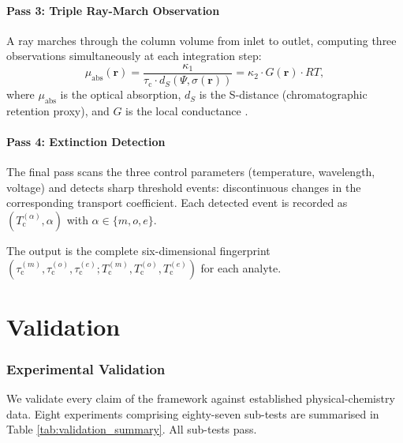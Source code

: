 \documentclass[twocolumn,10pt,a4paper]{article}
\theoremstyle{definition}
\theoremstyle{remark}
\newcommand{\Tcrit}{T_{\mathrm{c}}}
\newcommand{\tauC}{\tau_{\mathrm{c}}}
\newcommand{\tauM}{\tau_{\mathrm{c}}^{(m)}}
\newcommand{\tauO}{\tau_{\mathrm{c}}^{(o)}}
\newcommand{\tauE}{\tau_{\mathrm{c}}^{(e)}}
\newcommand{\TcM}{T_{\mathrm{c}}^{(m)}}
\newcommand{\TcO}{T_{\mathrm{c}}^{(o)}}
\newcommand{\TcE}{T_{\mathrm{c}}^{(e)}}
\begin{document}
\subsection{Pass 3: Triple Ray-March Observation}

A ray marches through the column volume from inlet to outlet, computing three observations simultaneously at each integration step:
\begin{equation}
\mu_{\mathrm{abs}}(\mathbf{r}) = \frac{\kappa_1}{\tauC \cdot d_S(\Psi, \sigma(\mathbf{r}))} = \kappa_2 \cdot G(\mathbf{r}) \cdot RT,
\label{eq:triple_observation}
\end{equation}
where $\mu_{\mathrm{abs}}$ is the optical absorption, $d_S$ is the S-distance (chromatographic retention proxy), and $G$ is the local conductance \citep{beer1852,lambert1760,born1999optics}.

\subsection{Pass 4: Extinction Detection}

The final pass scans the three control parameters (temperature, wavelength, voltage) and detects sharp threshold events: discontinuous changes in the corresponding transport coefficient. Each detected event is recorded as $(\Tcrit^{(\alpha)}, \alpha)$ with $\alpha \in \{m, o, e\}$.

The output is the complete six-dimensional fingerprint $(\tauM, \tauO, \tauE; \TcM, \TcO, \TcE)$ for each analyte.

\part{Validation}

\section{Experimental Validation}
\label{sec:validation}

We validate every claim of the framework against established physical-chemistry data. Eight experiments comprising eighty-seven sub-tests are summarised in Table \ref{tab:validation_summary}. All sub-tests pass.
\end{document}

